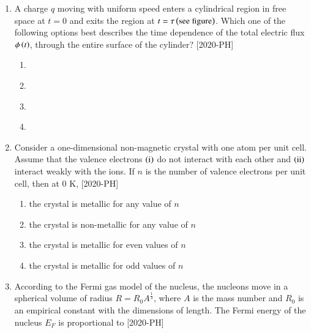 \documentclass[journal]{IEEEtran}
\begin{document}
\begin{enumerate}[start=40]
\item A charge $q$ moving with uniform speed enters a cylindrical region in free space at $t=0$ and exits the region at $t=\tau \left(\text{see figure}\right)$. Which one of the following options best describes the time dependence of the total electric flux $\phi \left(t\right)$, through the entire surface of the cylinder? \hfill{[2020-PH]}\\
\begin{figure}[H]
			\centering
			
			\label{44}
		\end{figure}
\begin{enumerate}
    \item \begin{figure}[H]
			\centering
			
		\end{figure}
    \item \begin{figure}[H]
			\centering
			
		\end{figure}
    \item \begin{figure}[H]
			\centering
			
		\end{figure}
  \item \begin{figure}[H]
			\centering
			
		\end{figure}
\end{enumerate}
\item Consider a one-dimensional non-magnetic crystal with one atom per unit cell. Assume that the valence electrons $\left(\text{i}\right)$ do not interact with each other and $\left(\text{ii}\right)$ interact weakly with the ions. If $n$ is the number of valence electrons per unit cell, then at $0$ K, \hfill{[2020-PH]}\\
\begin{enumerate}
    \item the crystal is metallic for any value of $n$
    \item the crystal is non-metallic for any value of $n$
    \item the crystal is metallic for even values of $n$
    \item the crystal is metallic for odd values of $n$
\end{enumerate}
\item According to the Fermi gas model of the nucleus, the nucleons move in a spherical volume of radius $R = R_{0}A^\frac{1}{3}$, where $A$ is the mass number and $R_0$ is an empirical constant with the dimensions of length. The Fermi energy of the nucleus $E_{F}$ is proportional to \hfill{[2020-PH]}\\

\end{enumerate}
\end{document}
